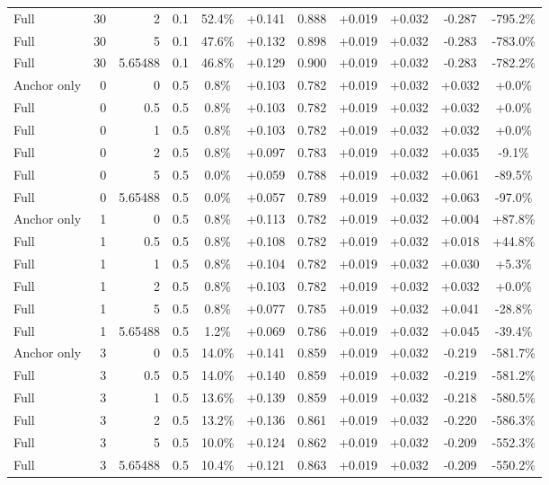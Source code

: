 \begin{table}[htbp]
\begin{tabular}{lrrrccccccc}
Full & 30 & 2 & 0.1 & 52.4\% & +0.141 & 0.888 & +0.019 & +0.032 & -0.287 & -795.2\% \\
Full & 30 & 5 & 0.1 & 47.6\% & +0.132 & 0.898 & +0.019 & +0.032 & -0.283 & -783.0\% \\
Full & 30 & 5.65488 & 0.1 & 46.8\% & +0.129 & 0.900 & +0.019 & +0.032 & -0.283 & -782.2\% \\
Anchor only & 0 & 0 & 0.5 & 0.8\% & +0.103 & 0.782 & +0.019 & +0.032 & +0.032 & +0.0\% \\
Full & 0 & 0.5 & 0.5 & 0.8\% & +0.103 & 0.782 & +0.019 & +0.032 & +0.032 & +0.0\% \\
Full & 0 & 1 & 0.5 & 0.8\% & +0.103 & 0.782 & +0.019 & +0.032 & +0.032 & +0.0\% \\
Full & 0 & 2 & 0.5 & 0.8\% & +0.097 & 0.783 & +0.019 & +0.032 & +0.035 & -9.1\% \\
Full & 0 & 5 & 0.5 & 0.0\% & +0.059 & 0.788 & +0.019 & +0.032 & +0.061 & -89.5\% \\
Full & 0 & 5.65488 & 0.5 & 0.0\% & +0.057 & 0.789 & +0.019 & +0.032 & +0.063 & -97.0\% \\
Anchor only & 1 & 0 & 0.5 & 0.8\% & +0.113 & 0.782 & +0.019 & +0.032 & +0.004 & +87.8\% \\
Full & 1 & 0.5 & 0.5 & 0.8\% & +0.108 & 0.782 & +0.019 & +0.032 & +0.018 & +44.8\% \\
Full & 1 & 1 & 0.5 & 0.8\% & +0.104 & 0.782 & +0.019 & +0.032 & +0.030 & +5.3\% \\
Full & 1 & 2 & 0.5 & 0.8\% & +0.103 & 0.782 & +0.019 & +0.032 & +0.032 & +0.0\% \\
Full & 1 & 5 & 0.5 & 0.8\% & +0.077 & 0.785 & +0.019 & +0.032 & +0.041 & -28.8\% \\
Full & 1 & 5.65488 & 0.5 & 1.2\% & +0.069 & 0.786 & +0.019 & +0.032 & +0.045 & -39.4\% \\
Anchor only & 3 & 0 & 0.5 & 14.0\% & +0.141 & 0.859 & +0.019 & +0.032 & -0.219 & -581.7\% \\
Full & 3 & 0.5 & 0.5 & 14.0\% & +0.140 & 0.859 & +0.019 & +0.032 & -0.219 & -581.2\% \\
Full & 3 & 1 & 0.5 & 13.6\% & +0.139 & 0.859 & +0.019 & +0.032 & -0.218 & -580.5\% \\
Full & 3 & 2 & 0.5 & 13.2\% & +0.136 & 0.861 & +0.019 & +0.032 & -0.220 & -586.3\% \\
Full & 3 & 5 & 0.5 & 10.0\% & +0.124 & 0.862 & +0.019 & +0.032 & -0.209 & -552.3\% \\
Full & 3 & 5.65488 & 0.5 & 10.4\% & +0.121 & 0.863 & +0.019 & +0.032 & -0.209 & -550.2\% \\

\end{tabular}
\end{table}
